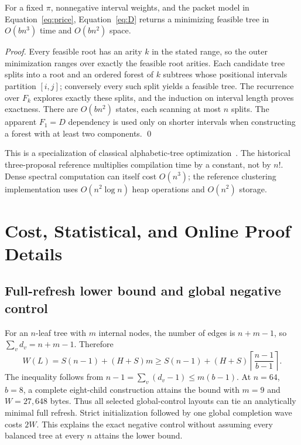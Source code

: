 \begin{theorem}\label{thm:exact}
For a fixed $\pi$, nonnegative interval weights, and the packet model in
Equation~\eqref{eq:price}, Equation~\eqref{eq:D} returns a minimizing feasible
tree in $O(bn^3)$ time and $O(bn^2)$ space.
\end{theorem}
\begin{proof}
Every feasible root has an arity $k$ in the stated range, so the outer
minimization ranges over exactly the feasible root arities. Each candidate tree
splits into a root and an ordered forest of $k$ subtrees whose positional
intervals partition $[i,j]$; conversely every such split yields a feasible tree.
The recurrence over $F_k$ explores exactly these splits, and the induction on
interval length proves exactness.
There are $O(bn^2)$ states, each scanning at most $n$ splits. The apparent
$F_1=D$ dependency is used only on shorter intervals when constructing a forest
with at least two components. \qed
\end{proof}
This is a specialization of classical alphabetic-tree
optimization~\cite{alphabetic}. The historical three-proposal reference
multiplies compilation time by a constant, not by $n!$. Dense spectral
computation can itself cost $O(n^3)$; the reference clustering implementation
uses $O(n^2\log n)$ heap operations and $O(n^2)$ storage.

\section{Cost, Statistical, and Online Proof Details}\label{app:proofs}
\subsection{Full-refresh lower bound and global negative control}
For an $n$-leaf tree with $m$ internal nodes, the number of edges is $n+m-1$, so
$\sum_v d_v=n+m-1$. Therefore
\begin{equation}W(L)=S(n-1)+(H+S)m\ge S(n-1)+(H+S)\left\lceil\frac{n-1}{b-1}\right\rceil.\label{eq:lb}\end{equation}
The inequality follows from $n-1=\sum_v(d_v-1)\le m(b-1)$. At $n=64$, $b=8$, a
complete eight-child construction attains the bound with $m=9$ and $W=27{,}648$
bytes. Thus all selected global-control layouts can tie an analytically minimal
full refresh. Strict initialization followed by one global completion wave costs
$2W$. This explains the exact negative control without assuming every balanced tree
at every $n$ attains the lower bound.

